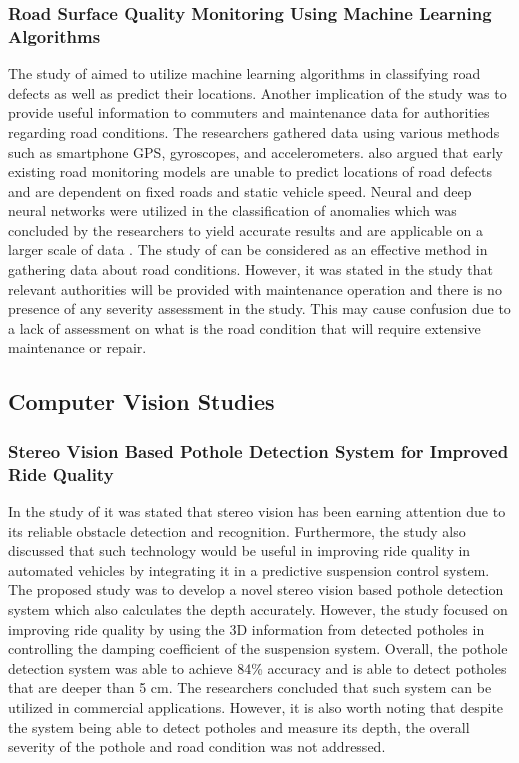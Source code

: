 \subsubsection{Road Surface Quality Monitoring Using Machine Learning Algorithms}
The study of  aimed to utilize machine learning algorithms in classifying road defects as well as predict their locations. Another implication of the study was to provide useful information to commuters and maintenance data for authorities regarding road conditions. The researchers gathered data using various methods such as smartphone GPS, gyroscopes, and accelerometers. \cite{singh2021} also argued that early existing road monitoring models are unable to predict locations of road defects and are dependent on fixed roads and static vehicle speed.  Neural and deep neural networks were utilized in the classification of anomalies which was concluded by the researchers to yield accurate results and are applicable on a larger scale of data \cite{singh2021}. The study of  can be considered as an effective method in gathering data about road conditions. However, it was stated in the study that relevant authorities will be provided with maintenance operation and there is no presence of any severity assessment in the study. This may cause confusion due to a lack of assessment on what is the road condition that will require extensive maintenance or repair.

\subsection{Computer Vision Studies}

\subsubsection{Stereo Vision Based Pothole Detection System for Improved Ride Quality}
In the study of  it was stated that stereo vision has been earning attention due to its reliable obstacle detection and recognition. Furthermore, the study also discussed that such technology would be useful in improving ride quality in automated vehicles by integrating it in a predictive suspension control system. The proposed study was to develop a novel stereo vision based pothole detection system which also calculates the depth accurately. However, the study focused on improving ride quality by using the 3D information from detected potholes in controlling the damping coefficient of the suspension system. Overall, the pothole detection system was able to achieve 84\% accuracy and is able to detect potholes that are deeper than 5 cm. The researchers concluded that such system can be utilized in commercial applications. However, it is also worth noting that despite the system being able to detect potholes and measure its depth, the overall severity of the pothole and road condition was not addressed.

